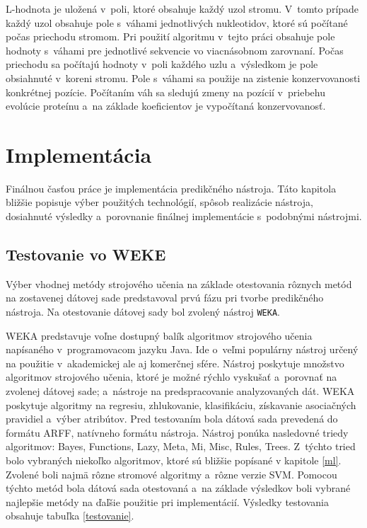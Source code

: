 L-hodnota je uložená v~poli, ktoré obsahuje každý uzol stromu. V~tomto prípade každý uzol obsahuje pole s~váhami jednotlivých nukleotidov, ktoré sú počítané počas priechodu stromom. Pri použití algoritmu v~tejto práci obsahuje pole hodnoty s~váhami pre jednotlivé sekvencie vo viacnásobnom zarovnaní. Počas priechodu sa počítajú hodnoty v~poli každého uzlu a~výsledkom je pole obsiahnuté v~koreni stromu. Pole s~váhami sa použije na zistenie konzervovanosti konkrétnej pozície. Počítaním váh sa sledujú zmeny na pozícií v~priebehu evolúcie proteínu a~na základe koeficientov je vypočítaná konzervovanosť.

\chapter{Implementácia}
Finálnou časťou práce je implementácia predikčného nástroja. Táto kapitola bližšie popisuje výber použitých technológií, spôsob realizácie nástroja, dosiahnuté výsledky a~porovnanie finálnej implementácie s~podobnými nástrojmi.

\section{Testovanie vo WEKE}
\label{wekatest}
Výber vhodnej metódy strojového učenia na základe otestovania rôznych metód na zostavenej dátovej sade predstavoval prvú fázu pri tvorbe predikčného nástroja. Na otestovanie dátovej sady bol zvolený nástroj \texttt{WEKA}.

WEKA \cite{weka} predstavuje voľne dostupný balík algoritmov strojového učenia napísaného v~programovacom jazyku Java. Ide o~veľmi populárny nástroj určený na použitie v~akademickej ale aj komerčnej sfére. Nástroj poskytuje množstvo algoritmov strojového učenia, ktoré je možné rýchlo vyskušať a~porovnať na zvolenej dátovej sade; a~nástroje na predspracovanie analyzovaných dát. WEKA poskytuje algoritmy na regresiu, zhlukovanie, klasifikáciu, získavanie asociačných pravidiel a~výber atribútov.
Pred testovaním bola dátová sada prevedená do formátu ARFF, natívneho formátu nástroja. Nástroj ponúka nasledovné triedy algoritmov: Bayes, Functions, Lazy, Meta, Mi, Misc, Rules, Trees. Z~týchto tried bolo vybraných niekoľko algoritmov, ktoré sú bližšie popísané v kapitole \ref{ml}. Zvolené boli najmä rôzne stromové algoritmy a~rôzne verzie SVM. Pomocou týchto metód bola dátová sada otestovaná a~na základe výsledkov boli vybrané najlepšie metódy na ďaľšie použitie pri implementácií. Výsledky testovania obsahuje tabuľka \ref{testovanie}.

